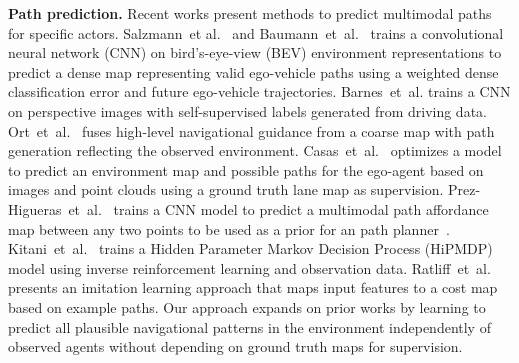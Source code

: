 \documentclass[letterpaper, 10 pt, conference]{ieeeconf}
\begin{document}
\noindent \textbf{Path prediction.} Recent works present methods to predict multimodal paths for specific actors.
Salzmann~et al.~\cite{salzmann2019online_path_generation} and Baumann~et~al.~\cite{baumann2018ego_path} trains a convolutional neural network (CNN) on bird's-eye-view (BEV) environment representations to predict a dense map representing valid ego-vehicle paths using a weighted dense classification error and future ego-vehicle trajectories. Barnes~et~al.\cite{barnes2017ws_path_proposal} trains a CNN on perspective images with self-supervised labels generated from driving data. Ort~et~al.~\cite{ort2020maplite} fuses high-level navigational guidance from a coarse map with path generation reflecting the observed environment. Casas~et~al.~\cite{casas2021mp3} optimizes a model to predict an environment map and possible paths for the ego-agent based on images and point clouds using a ground truth lane map as supervision.
Prez-Higueras~et~al.~\cite{prez-higueras2018point_to_point_path} trains a CNN model to predict a multimodal path affordance map between any two points to be used as a prior for an  path planner~\cite{karaman2011RRT_star}. 
Kitani~et~al.~\cite{kitani2012activity_forcasting} trains a Hidden Parameter Markov Decision Process (HiPMDP) model
using inverse reinforcement learning and observation data. Ratliff~et~al.~\cite{ratliff2009learch} presents an imitation learning approach that maps input features to a cost map based on example paths.
Our approach expands on prior works by learning to  predict all plausible navigational patterns in the environment independently of observed agents without depending on ground truth maps for supervision.
\end{document}
